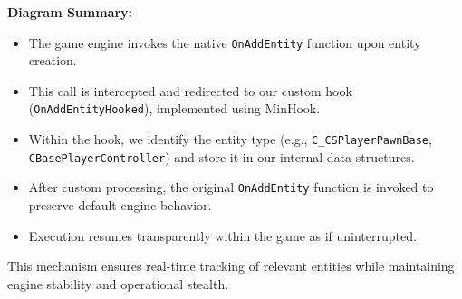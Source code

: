 \noindent
\textbf{Diagram Summary:}
\begin{itemize}
    \item The game engine invokes the native \texttt{OnAddEntity} function upon entity creation.
    \item This call is intercepted and redirected to our custom hook (\texttt{OnAddEntityHooked}), implemented using MinHook.
    \item Within the hook, we identify the entity type (e.g., \texttt{C\_CSPlayerPawnBase}, \texttt{CBasePlayerController}) and store it in our internal data structures.
    \item After custom processing, the original \texttt{OnAddEntity} function is invoked to preserve default engine behavior.
    \item Execution resumes transparently within the game as if uninterrupted.
\end{itemize}

This mechanism ensures real-time tracking of relevant entities while maintaining engine stability and operational stealth.